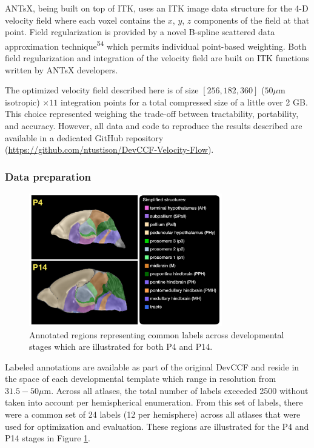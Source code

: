 \documentclass[
  12pt,
]{article}
\begin{document}
ANTsX, being built on top of ITK, uses an ITK image data structure for
the 4-D velocity field where each voxel contains the \(x\), \(y\), \(z\)
components of the field at that point. Field regularization is provided
by a novel B-spline scattered data approximation
technique\textsuperscript{54} which permits individual point-based
weighting. Both field regularization and integration of the velocity
field are built on ITK functions written by ANTsX developers.

The optimized velocity field described here is of size
\([256, 182, 360]\) (\(50 \mu\)m isotropic) \(\times 11\) integration
points for a total compressed size of a little over 2 GB. This choice
represented weighing the trade-off between tractability, portability,
and accuracy. However, all data and code to reproduce the results
described are available in a dedicated GitHub repository
(\url{https://github.com/ntustison/DevCCF-Velocity-Flow}).

\hypertarget{data-preparation-1}{%
\subsubsection*{Data preparation}\label{data-preparation-1}}

\begin{figure}[!htb]
\centering
\includegraphics[width=0.75\textwidth]{Figures/SimplifiedAnnotations.pdf}
\caption{Annotated regions representing common labels across developmental stages which
are illustrated for both P4 and P14.}
\label{fig:simplifiedannotations}
\end{figure}

Labeled annotations are available as part of the original DevCCF and
reside in the space of each developmental template which range in
resolution from \(31.5-50 \mu\)m. Across all atlases, the total number
of labels exceeded 2500 without taken into account per hemispherical
enumeration. From this set of labels, there were a common set of 24
labels (12 per hemisphere) across all atlases that were used for
optimization and evaluation. These regions are illustrated for the P4
and P14 stages in Figure \ref{fig:simplifiedannotations}.
\end{document}
